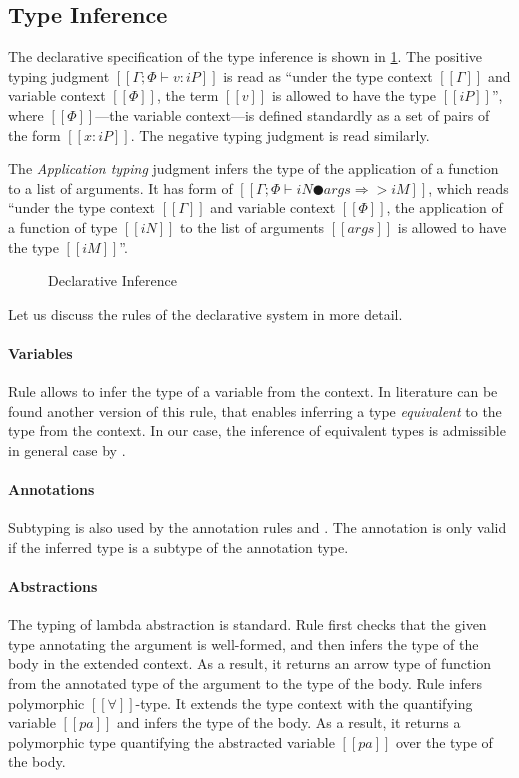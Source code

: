 \subsection{Type Inference}

The declarative specification of the type inference is shown in 
\cref{fig:declarative-inference}.
The positive typing judgment $[[Γ ; Φ ⊢ v : iP]]$ is read as 
``under the type context $[[Γ]]$ and variable context $[[Φ]]$,
the term $[[v]]$ is allowed to have the type $[[iP]]$'',
where $[[Φ]]$---the variable context---is defined standardly as
a set of pairs of the form $[[x : iP]]$. 
The negative typing judgment is read similarly.

The \emph{Application typing} judgment
infers the type of the application of a function to a list of arguments.
It has form of $[[Γ ; Φ ⊢ iN ● args ⇒> iM]]$, 
which reads ``under the type context $[[Γ]]$ and variable context $[[Φ]]$,
the application of a function of type $[[iN]]$ to the list of arguments $[[args]]$
is allowed to have the type $[[iM]]$''.

\begin{figure}[h]
  \ottdefnsDTLabeled
  \caption{Declarative Inference}
  \label{fig:declarative-inference}
\end{figure}

Let us discuss the rules of the declarative system in more detail.

\paragraph{Variables}
  Rule  allows to infer
  the type of a variable from the context. 
  In literature can be found another version of this rule,
  that enables inferring a type \emph{equivalent}
  to the type from the context. 
  In our case, the inference of equivalent types
  is admissible in general case by .

\paragraph{Annotations}
  Subtyping is also used by the annotation rules 
  and . The annotation is only valid if the
  inferred type is a subtype of the annotation type.


\paragraph{Abstractions}
  The typing of lambda abstraction is standard. 
  Rule  first checks
  that the given type annotating the argument is well-formed,
  and then infers the type of the body in the extended context.
  As a result, it returns an arrow type of function from the
  annotated type of the argument to the type of the body.
  Rule  infers polymorphic $[[∀]]$-type. 
  It extends the type context with the quantifying variable $[[pa]]$ and 
  infers the type of the body. As a result, it returns a polymorphic type
  quantifying the abstracted variable $[[pa]]$ over the type of the body.

